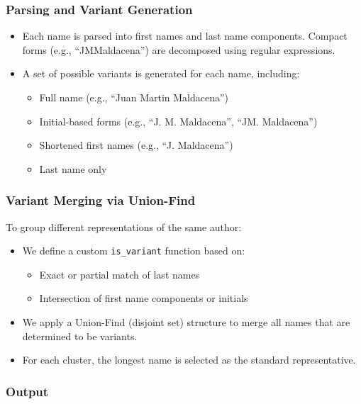 \documentclass[12pt]{article}
\begin{document}
\subsubsection*{Parsing and Variant Generation}

\begin{itemize}
    \item Each name is parsed into first names and last name components. Compact forms (e.g., ``JMMaldacena'') are decomposed using regular expressions.
    \item A set of possible variants is generated for each name, including:
        \begin{itemize}
            \item Full name (e.g., ``Juan Martin Maldacena'')
            \item Initial-based forms (e.g., ``J. M. Maldacena'', ``JM. Maldacena'')
            \item Shortened first names (e.g., ``J. Maldacena'')
            \item Last name only
        \end{itemize}
\end{itemize}

\subsubsection*{Variant Merging via Union-Find}

To group different representations of the same author:
\begin{itemize}
    \item We define a custom \texttt{is\_variant} function based on:
        \begin{itemize}
            \item Exact or partial match of last names
            \item Intersection of first name components or initials
        \end{itemize}
    \item We apply a Union-Find (disjoint set) structure to merge all names that are determined to be variants.
    \item For each cluster, the longest name is selected as the standard representative.
\end{itemize}

\subsubsection*{Output}
\end{document}
